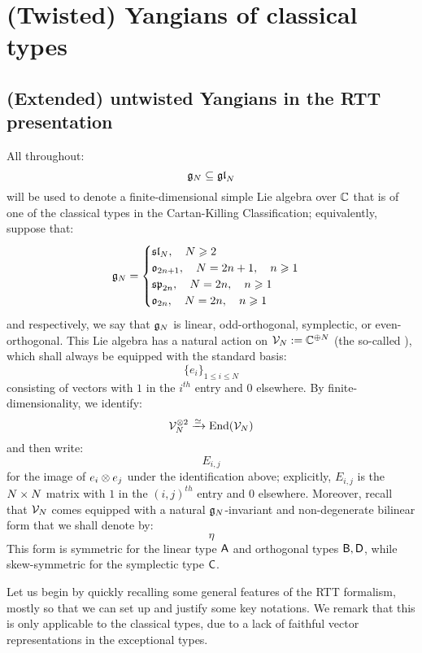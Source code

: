 \section{(Twisted) Yangians of classical types}
    \subsection{(Extended) untwisted Yangians in the RTT presentation}
        All throughout:
            $$\mathfrak{g}_N \subseteq \mathfrak{gl}_N$$
        will be used to denote a finite-dimensional simple Lie algebra over $\mathbb{C}$ that is of one of the classical types in the Cartan-Killing Classification; equivalently, suppose that:
            $$
                \mathfrak{g}_N =
                \begin{cases}
                    \mathfrak{sl}_N, \quad N \geqslant 2
                    \\
                    \mathfrak{o}_{2n + 1}, \quad N = 2n + 1, \quad n \geqslant 1
                    \\
                    \mathfrak{sp}_{2n}, \quad N = 2n, \quad n \geqslant 1
                    \\
                    \mathfrak{o}_{2n}, \quad N = 2n, \quad n \geqslant 1
                \end{cases}
            $$
        and respectively, we say that $\mathfrak{g}_N$ is linear, odd-orthogonal, symplectic, or even-orthogonal. This Lie algebra has a natural action on $\mathcal{V}_N := \mathbb{C}^{\oplus N}$ (the so-called ), which shall always be equipped with the standard basis:
            $$\{e_i\}_{1 \leq i \leq N}$$
        consisting of vectors with $1$ in the $i^{th}$ entry and $0$ elsewhere. By finite-dimensionality, we identify:
            $$\calV_N^{\tensor 2} \xrightarrow[]{\cong} \End(\calV_N)$$
        and then write:
            $$E_{i, j}$$
        for the image of $e_i \tensor e_j$ under the identification above; explicitly, $E_{i, j}$ is the $N \x N$ matrix with $1$ in the $(i, j)^{th}$ entry and $0$ elsewhere. Moreover, recall that $\mathcal{V}_N$ comes equipped with a natural $\mathfrak{g}_N$-invariant and non-degenerate bilinear form that we shall denote by:
            $$\eta$$
        This form is symmetric for the linear type $\mathsf{A}$ and orthogonal types $\mathsf{B}, \mathsf{D}$, while skew-symmetric for the symplectic type $\mathsf{C}$.
    
        Let us begin by quickly recalling some general features of the RTT formalism, mostly so that we can set up and justify some key notations. We remark that this is only applicable to the classical types, due to a lack of faithful vector representations in the exceptional types.
            
